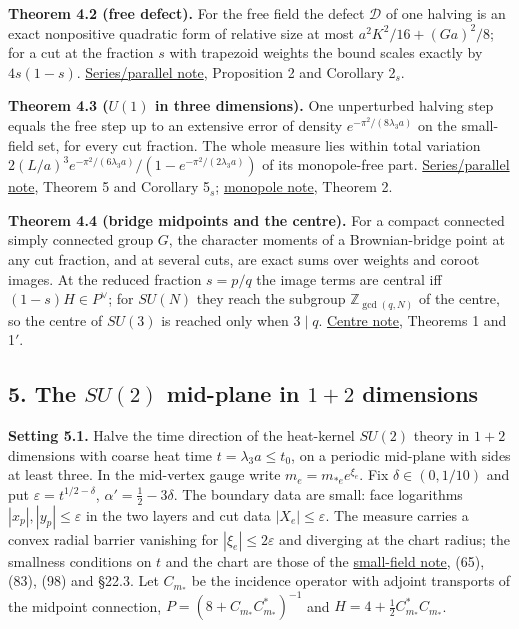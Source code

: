 \documentclass[11pt,a4paper]{article}
\begin{document}
\textbf{Theorem 4.2 (free defect).} For the free field the defect
\(\mathcal D\) of one halving is an exact nonpositive quadratic form of
relative size at most \(a^2K^2/16+(Ga)^2/8\); for a cut at the fraction
\(s\) with trapezoid weights the bound scales exactly by \(4s(1-s)\).
\href{series-parallel-gauge-refinement.md}{Series/parallel note},
Proposition 2 and Corollary 2\(_s\).

\textbf{Theorem 4.3 (\(U(1)\) in three dimensions).} One unperturbed
halving step equals the free step up to an extensive error of density
\(e^{-\pi^2/(8\lambda_3a)}\) on the small-field set, for every cut
fraction. The whole measure lies within total variation
\(2(L/a)^3e^{-\pi^2/(6\lambda_3a)}/(1-e^{-\pi^2/(2\lambda_3a)})\) of its
monopole-free part.
\href{series-parallel-gauge-refinement.md}{Series/parallel note},
Theorem 5 and Corollary 5\(_s\);
\href{villain-monopole-refinement.md}{monopole note}, Theorem 2.

\textbf{Theorem 4.4 (bridge midpoints and the centre).} For a compact
connected simply connected group \(G\), the character moments of a
Brownian-bridge point at any cut fraction, and at several cuts, are
exact sums over weights and coroot images. At the reduced fraction
\(s=p/q\) the image terms are central iff \((1-s)H\in P^\vee\); for
\(SU(N)\) they reach the subgroup \(\mathbb Z_{\gcd(q,N)}\) of the
centre, so the centre of \(SU(3)\) is reached only when \(3\mid q\).
\href{sun-midpoint-centre.md}{Centre note}, Theorems 1 and 1\('\).

\hypertarget{the-su2-mid-plane-in-12-dimensions}{%
\subsection{\texorpdfstring{5. The \(SU(2)\) mid-plane in \(1+2\)
dimensions}{5. The SU(2) mid-plane in 1+2 dimensions}}\label{the-su2-mid-plane-in-12-dimensions}}

\textbf{Setting 5.1.} Halve the time direction of the heat-kernel
\(SU(2)\) theory in \(1+2\) dimensions with coarse heat time
\(t=\lambda_3a\le t_0\), on a periodic mid-plane with sides at least
three. In the mid-vertex gauge write \(m_e=m_{*e}e^{\xi_e}\). Fix
\(\delta\in(0,1/10)\) and put \(\varepsilon=t^{1/2-\delta}\),
\(\alpha'=\frac12-3\delta\). The boundary data are small: face
logarithms \(|x_p|,|y_p|\le\varepsilon\) in the two layers and cut data
\(|X_e|\le\varepsilon\). The measure carries a convex radial barrier
vanishing for \(|\xi_e|\le2\varepsilon\) and diverging at the chart
radius; the smallness conditions on \(t\) and the chart are those of the
\href{su2-midplane-small-field.md}{small-field note}, (65), (83), (98)
and §22.3. Let \(C_{m_*}\) be the incidence operator with adjoint
transports of the midpoint connection, \(P=(8+C_{m_*}C_{m_*}^*)^{-1}\)
and \(H=4+\frac12C_{m_*}^*C_{m_*}\).
\end{document}
